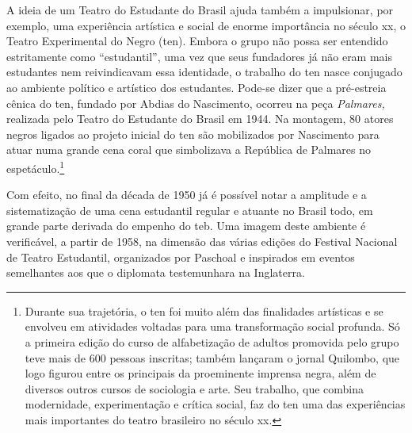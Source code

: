 A ideia de um Teatro do Estudante do Brasil ajuda também a impulsionar,
por exemplo, uma experiência artística e social de enorme importância no
século {\sc xx}, o Teatro Experimental do Negro ({\sc ten}). Embora o grupo não
possa ser entendido estritamente como “estudantil”, uma vez que seus
fundadores já não eram mais estudantes nem reivindicavam essa
identidade, o trabalho do {\sc ten} nasce conjugado ao ambiente político e
artístico dos estudantes. Pode-se dizer que a pré-estreia cênica do {\sc ten},
fundado por Abdias do Nascimento, ocorreu na peça {\it Palmares,}
realizada pelo Teatro do Estudante do Brasil em 1944. Na montagem, 80
atores negros ligados ao projeto inicial do {\sc ten} são mobilizados por
Nascimento para atuar numa grande cena coral que simbolizava a República
de Palmares no espetáculo.\footnote{Durante sua trajetória, o {\sc ten} foi
  muito além das finalidades artísticas e se envolveu em atividades
  voltadas para uma transformação social profunda. Só a primeira edição
  do curso de alfabetização de adultos promovida pelo grupo teve mais de
  600 pessoas inscritas; também lançaram o jornal Quilombo, que logo
  figurou entre os principais da proeminente imprensa negra, além de
  diversos outros cursos de sociologia e arte. Seu trabalho, que combina
  modernidade, experimentação e crítica social, faz do {\sc ten} uma das
  experiências mais importantes do teatro brasileiro no século {\sc xx}.}

Com efeito, no final da década de 1950 já é possível notar a amplitude e
a sistematização de uma cena estudantil regular e atuante no Brasil
todo, em grande parte derivada do empenho do {\sc teb}. Uma imagem deste
ambiente é verificável, a partir de 1958, na dimensão das várias edições
do Festival Nacional de Teatro Estudantil, organizados por Paschoal e
inspirados em eventos semelhantes aos que o diplomata testemunhara na
Inglaterra.

